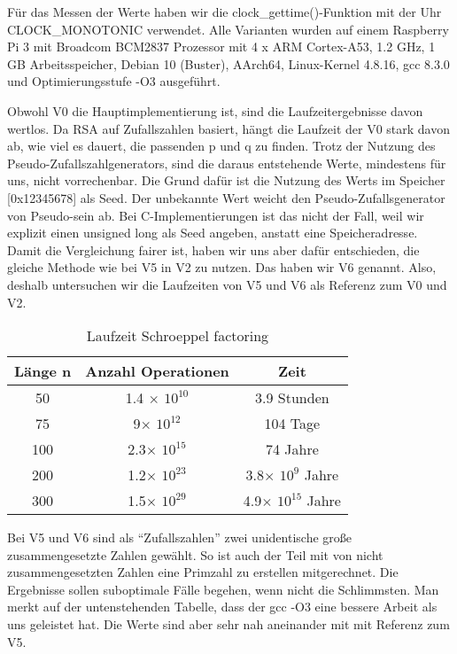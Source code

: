 \documentclass[course=asp]{aspdoc}
\begin{document}
Für das Messen der Werte haben wir die clock\_gettime()-Funktion mit der Uhr CLOCK\_MONOTONIC verwendet. Alle Varianten wurden auf einem Raspberry Pi 3 mit Broadcom BCM2837 Prozessor mit 4 x ARM Cortex-A53, 1.2 GHz, 1 GB Arbeitsspeicher, Debian 10 (Buster), AArch64, Linux-Kernel 4.8.16, gcc 8.3.0 und Optimierungsstufe -O3 ausgeführt.

Obwohl V0 die Hauptimplementierung ist, sind die Laufzeitergebnisse davon wertlos. Da RSA auf Zufallszahlen basiert, hängt die Laufzeit der V0 stark davon ab, wie viel es dauert, die passenden p und q zu finden. Trotz der Nutzung des Pseudo-Zufallszahlgenerators, sind die daraus entstehende Werte, mindestens für uns, nicht vorrechenbar. Die Grund dafür ist die Nutzung des Werts im Speicher [0x12345678] als Seed. Der unbekannte Wert weicht den Pseudo-Zufallsgenerator von Pseudo-sein ab. Bei C-Implementierungen ist das nicht der Fall, weil wir explizit einen unsigned long als Seed angeben, anstatt eine Speicheradresse. Damit die Vergleichung fairer ist, haben wir uns aber dafür entschieden, die gleiche Methode wie bei V5 in V2 zu nutzen. Das haben wir V6 genannt. Also, deshalb untersuchen wir die Laufzeiten von V5 und V6 als Referenz zum V0 und V2.

\begin{table}[H]
\centering
   \begin{tabular}{||c c c||} 
 \hline
 Länge n & Anzahl Operationen & Zeit  \\ [0.5ex] 
 \hline\hline
 50 & 1.4 $\times$ $10^{10}$  & 3.9 Stunden  \\ 
 \hline
 75 & 9$\times $ $10^{12}$  & 104 Tage  \\
 \hline
 100 & 2.3$\times $ $10^{15}$ & 74 Jahre  \\
 \hline
 200 & 1.2$\times $ $10^{23}$ & 3.8$\times $ $10^{9}$ Jahre\\
 \hline
 300 & 1.5$\times $ $10^{29}$ & 4.9$\times $ $10^{15}$ Jahre \\ [1ex] 
 \hline

\end{tabular}
    \caption{Laufzeit Schroeppel factoring}
\end{table}

Bei V5 und V6 sind als “Zufallszahlen” zwei unidentische große zusammengesetzte Zahlen gewählt. So ist auch der Teil mit von nicht zusammengesetzten Zahlen eine Primzahl zu erstellen mitgerechnet. Die Ergebnisse sollen suboptimale Fälle begehen, wenn nicht die Schlimmsten. Man merkt auf der untenstehenden Tabelle, dass der gcc -O3 eine bessere Arbeit als uns geleistet hat. Die Werte sind aber sehr nah aneinander mit mit Referenz zum V5.
\end{document}
